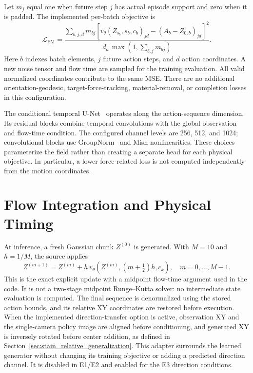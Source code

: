Let \(m_j\) equal one when future step \(j\) has actual episode support and zero when it is padded. The implemented per-batch objective is
\begin{equation}
 \mathcal L_{\mathrm{FM}}=
 \frac{\displaystyle\sum_{b,j,d}m_{bj}
 \left[v_\theta(Z_{s_b},s_b,c_b)_{jd}-(A_b-Z_{0,b})_{jd}\right]^2}
 {d_a\,\max\!\left(1,\sum_{b,j}m_{bj}\right)}.
 \label{eq:imitation_loss}
\end{equation}
Here \(b\) indexes batch elements, \(j\) future action steps, and \(d\) action coordinates. A new noise tensor and flow time are sampled for the training evaluation. All valid normalized coordinates contribute to the same MSE. There are no additional orientation-geodesic, target-force-tracking, material-removal, or completion losses in this configuration.

The conditional temporal U-Net~\cite{ronneberger2015unet} operates along the action-sequence dimension. Its residual blocks combine temporal convolutions with the global observation and flow-time condition. The configured channel levels are 256, 512, and 1024; convolutional blocks use GroupNorm~\cite{wu2018groupnorm} and Mish nonlinearities. These choices parameterize the field rather than creating a separate head for each physical objective. In particular, a lower force-related loss is not computed independently from the motion coordinates.

\section{Flow Integration and Physical Timing}
At inference, a fresh Gaussian chunk \(Z^{(0)}\) is generated. With \(M=10\) and \(h=1/M\), the source applies
\begin{equation}
 Z^{(m+1)}=Z^{(m)}+h\,
 v_\theta\!\left(Z^{(m)},(m+\tfrac12)h,c_k\right),
 \quad m=0,\ldots,M-1.
 \label{eq:flow_integration}
\end{equation}
This is the exact explicit update with a midpoint flow-time argument used in the code. It is not a two-stage midpoint Runge--Kutta solver: no intermediate state evaluation is computed. The final sequence is denormalized using the stored action bounds, and its relative XY coordinates are restored before execution. When the implemented direction-transfer option is active, observation XY and the single-camera policy image are aligned before conditioning, and generated XY is inversely rotated before center addition, as defined in Section~\ref{sec:stain_relative_generalization}. This adapter surrounds the learned generator without changing its training objective or adding a predicted direction channel. It is disabled in E1/E2 and enabled for the E3 direction conditions.

